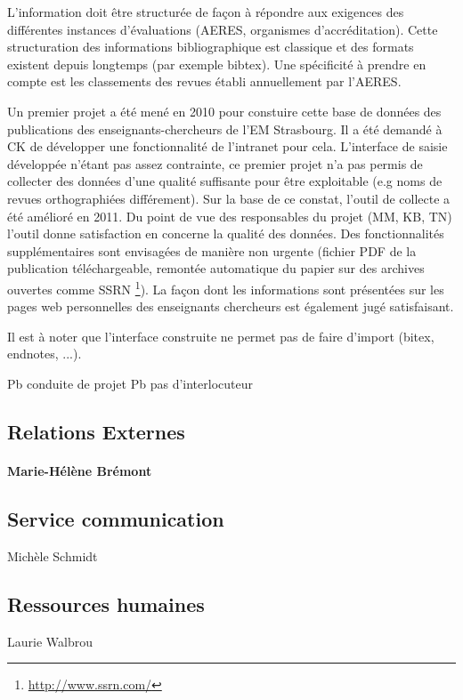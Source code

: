 \documentclass{book}
\begin{document}
L'information doit être structurée de façon à répondre aux exigences des 
différentes instances d'évaluations (AERES, organismes d'accréditation).
Cette structuration des informations bibliographique est classique et des
formats existent depuis longtemps (par exemple bibtex). Une spécificité
à prendre en compte est les classements des revues établi annuellement par 
l'AERES.

Un premier projet a été mené en 2010 pour constuire cette base de données des
publications des enseignants-chercheurs de l'EM Strasbourg. Il a été demandé à 
CK de développer une fonctionnalité de l'intranet pour cela. L'interface de 
saisie développée n'étant pas assez contrainte, ce premier projet n'a pas 
permis de collecter des données d'une qualité suffisante pour être exploitable
(e.g noms de revues orthographiées différement).
Sur la base de ce constat, l'outil de collecte a été amélioré en 2011.
Du point de vue des responsables du projet (MM, KB, TN) l'outil donne satisfaction 
en concerne la qualité des données. Des fonctionnalités supplémentaires sont
envisagées de manière non urgente (fichier PDF de la publication téléchargeable,
remontée automatique du papier sur des archives ouvertes comme SSRN%
\footnote{\url{ http://www.ssrn.com/}}).
La façon dont les informations sont présentées sur les pages web personnelles
des enseignants chercheurs%
est également jugé satisfaisant.


Il est à noter que l'interface construite ne permet pas de faire d'import (bitex, endnotes, ...).


Pb conduite de projet
Pb pas d'interlocuteur




\subsection{Relations Externes}
\paragraph{Marie-Hélène Brémont}

\subsection{Service communication}
Michèle Schmidt

\subsection{Ressources humaines}
Laurie Walbrou
\end{document}
